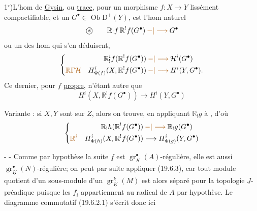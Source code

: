 1$^\circ$)\quad L'hom de \uline{Gysin}, ou \uline{trace}, pour un
morphisme $f:X\longrightarrow Y$ lissément compactifiable,
 et un $G^\bullet\in\operatorname{Ob}\mathrm D^+(Y)$, est l'hom
naturel
\[
\text{\textcircled{$*$}}\qquad
\mathbb{R}_!f\,\mathbb{R}^!f(G^\bullet)\mathbin{\unsure{-|\longrightarrow}}G^\bullet
\]
ou un des hom qui s'en déduisent,
\[
\left\{
\begin{aligned}
\mathbb{R}_!^if(\mathbb{R}^!f(G^\bullet))&\mathbin{\unsure{-|\longrightarrow}}\mathcal H^i(G^\bullet)\\
\deleted{\unsure{\mathbb{R}\Gamma\mathcal H}}\quad
H^i_{\Phi(f)}(X,\mathbb{R}^!f(G^\bullet))&\mathbin{\unsure{-|\longrightarrow}}H^i(Y,G^\bullet).
\end{aligned}
\right.
\]
Ce dernier, pour $f$ \uline{propre}, n'étant autre que
\[
H^i(X,\mathbb{R}^!f(G^\bullet))\longrightarrow H^i(Y,G^\bullet)
\]

Variante : si $X,Y$ sont sur $Z$, alors on
trouve, en appliquant $\mathbb{R}_!g$ à \unsure{\textcircled{$*$}},
d'où
\[
\left\{
\begin{aligned}
\mathbb{R}_!h(\mathbb{R}^!f(G^\bullet))&\mathbin{\unsure{-|\longrightarrow}}\mathbb{R}_!g(G^\bullet)\\
\deleted{\unsure{\mathbb{R}^i}}\quad
H^i_{\Phi(h)}(X,\mathbb{R}^!f(G^\bullet))&\longrightarrow
 H^i_{\Phi(g)}(Y,G^\bullet)
\end{aligned}
\right.
\]

-  -
Comme par hypothèse la suite $\underline f$ est $\operatorname{gr}_{\underline K}^\bullet(A)$-régulière, elle est aussi
$\operatorname{gr}_{\underline K}^\bullet(N)$-régulière; on peut par suite appliquer (19.6.3), car tout module
quotient d'un sous-module d'un 
$\operatorname{gr}_{\underline K}^k(M)$ est alors séparé pour
la topologie $\underline J$-préadique puisque les $f_i$ appartiennent au radical de $A$
par hypothèse. Le diagramme commutatif (19.6.2.1) s'écrit donc ici


